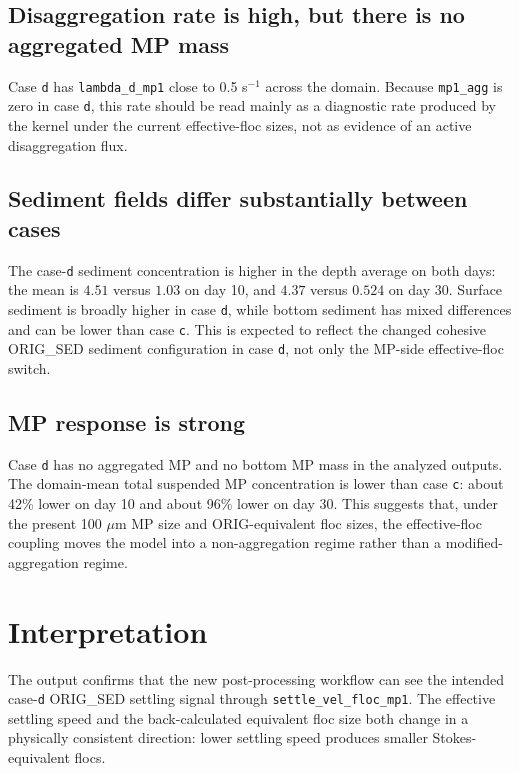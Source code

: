 \documentclass[11pt]{article}
\begin{document}
\subsection*{Disaggregation rate is high, but there is no aggregated MP mass}

Case \texttt{d} has \texttt{lambda\_d\_mp1} close to 0.5 s$^{-1}$ across the
domain.  Because \texttt{mp1\_agg} is zero in case \texttt{d}, this rate should
be read mainly as a diagnostic rate produced by the kernel under the current
effective-floc sizes, not as evidence of an active disaggregation flux.

\subsection*{Sediment fields differ substantially between cases}

The case-\texttt{d} sediment concentration is higher in the depth average on
both days: the mean is $4.51$ versus $1.03$ on day 10, and $4.37$ versus
$0.524$ on day 30.  Surface sediment is broadly higher in case \texttt{d},
while bottom sediment has mixed differences and can be lower than case
\texttt{c}.  This is expected to reflect the changed cohesive ORIG\_SED
sediment configuration in case \texttt{d}, not only the MP-side effective-floc
switch.

\subsection*{MP response is strong}

Case \texttt{d} has no aggregated MP and no bottom MP mass in the analyzed
outputs.  The domain-mean total suspended MP concentration is lower than case
\texttt{c}: about 42\% lower on day 10 and about 96\% lower on day 30.  This
suggests that, under the present 100 $\mu$m MP size and ORIG-equivalent floc
sizes, the effective-floc coupling moves the model into a non-aggregation
regime rather than a modified-aggregation regime.

\section*{Interpretation}

The output confirms that the new post-processing workflow can see the intended
case-\texttt{d} ORIG\_SED settling signal through
\texttt{settle\_vel\_floc\_mp1}.  The effective settling speed and the
back-calculated equivalent floc size both change in a physically consistent
direction: lower settling speed produces smaller Stokes-equivalent flocs.
\end{document}
